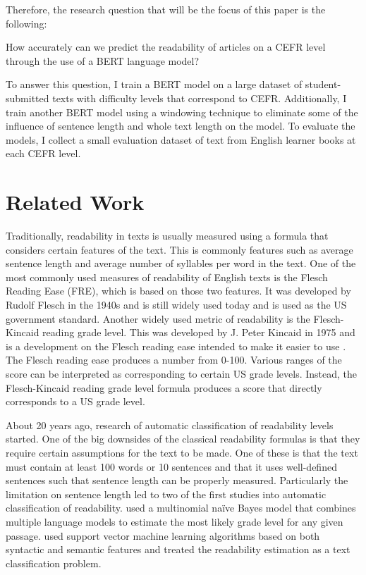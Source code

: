\documentclass[11pt,a4paper]{article}
\begin{document}
\noindent
Therefore, the research question that will be the focus of this paper is the
following:

\begin{displayquote}
  How accurately can we predict the readability of articles on a CEFR level
  through the use of a BERT language model?
\end{displayquote}

\noindent
To answer this question, I train a BERT model on a large dataset of student-
submitted texts with difficulty levels that correspond to CEFR. Additionally, I
train another BERT model using a windowing technique to eliminate some of the
influence of sentence length and whole text length on the model. To evaluate
the models, I collect a small evaluation dataset of text from English learner
books at each CEFR level.

\section{Related Work}

Traditionally, readability in texts is usually measured using a formula that
considers certain features of the text. This is commonly features such as
average sentence length and average number of syllables per word in the text.
One of the most commonly used measures of readability of English texts is the
Flesch Reading Ease (FRE), which is based on those two features. It was developed by
Rudolf Flesch in the 1940s and is still widely used today and is used as the US
government standard. Another widely used metric of readability is the Flesch-Kincaid reading grade level. This was
developed by J. Peter Kincaid in 1975 and is a development on the Flesch
reading ease intended to make it easier to use \parencite{Kincaid1975DerivationON}. The Flesch reading ease
produces a number from 0-100. Various ranges of the score can be interpreted as
corresponding to certain US grade levels. Instead, the Flesch-Kincaid reading
grade level formula produces a score that directly corresponds to a US grade
level.

About 20 years ago, research of automatic classification of readability levels
started. One of the big downsides of the classical readability
formulas is that they require certain assumptions for the text to be made.
One of these is that the text must contain at least 100 words or 10
sentences and that it uses well-defined sentences such that sentence length
can be properly measured. Particularly the limitation on sentence length led to
two of the first studies into automatic classification of readability.
\parencite{collins-thompson-callan-2004-language}
used a multinomial naïve Bayes model that combines multiple language models to
estimate the most likely grade level for any given passage.
\parencite{10.1145/1008992.1009114} used support vector machine learning algorithms
based on both syntactic and semantic features and treated the readability
estimation as a text classification problem.
\end{document}
